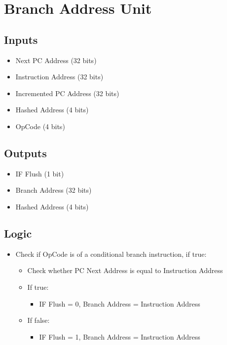 \documentclass[12pt]{report}
\begin{document}
\section{Branch Address Unit}

\subsection{Inputs}
\begin{itemize}
    \item Next PC Address (32 bits)
    \item Instruction Address (32 bits)
    \item Incremented PC Address (32 bits)
    \item Hashed Address (4 bits)
    \item OpCode (4 bits)
\end{itemize}

\subsection{Outputs}
\begin{itemize}
    \item IF Flush (1 bit)
    \item Branch Address (32 bits)
    \item Hashed Address (4 bits)
\end{itemize}

\subsection{Logic}
\begin{itemize}
    \item Check if OpCode is of a conditional branch instruction, if true:
    \begin{itemize}
        \item Check whether PC Next Address is equal to Instruction Address
        \item If true:
        \begin{itemize}
            \item IF Flush = 0, Branch Address = Instruction Address
        \end{itemize}
        \item If false:
        \begin{itemize}
            \item IF Flush = 1, Branch Address = Instruction Address
        \end{itemize}
    \end{itemize}
\end{itemize}
\end{document}
